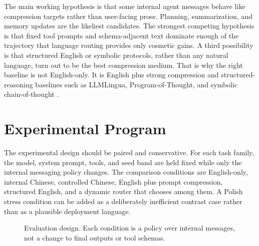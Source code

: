 \documentclass[11pt]{article}
\begin{document}
The main working hypothesis is that some internal agent messages behave like compression targets rather than user-facing prose. Planning, summarization, and memory updates are the likeliest candidates. The strongest competing hypothesis is that fixed tool prompts and schema-adjacent text dominate enough of the trajectory that language routing provides only cosmetic gains. A third possibility is that structured English or symbolic protocols, rather than any natural language, turn out to be the best compression medium. That is why the right baseline is not English-only. It is English plus strong compression and structured-reasoning baselines such as LLMLingua, Program-of-Thought, and symbolic chain-of-thought \cite{jiang2023llmlingua,pan2024llmlingua2,chen2022program,xu2024symbolic}.

\section{Experimental Program}

The experimental design should be paired and conservative. For each task family, the model, system prompt, tools, and seed band are held fixed while only the internal messaging policy changes. The comparison conditions are English-only, internal Chinese, controlled Chinese, English plus prompt compression, structured English, and a dynamic router that chooses among them. A Polish stress condition can be added as a deliberately inefficient contrast case rather than as a plausible deployment language.

\begin{figure}[t]
\centering
{}
\caption{Evaluation design. Each condition is a policy over internal messages, not a change to final outputs or tool schemas.}
\label{fig:evaluation}
\end{figure}
\end{document}

